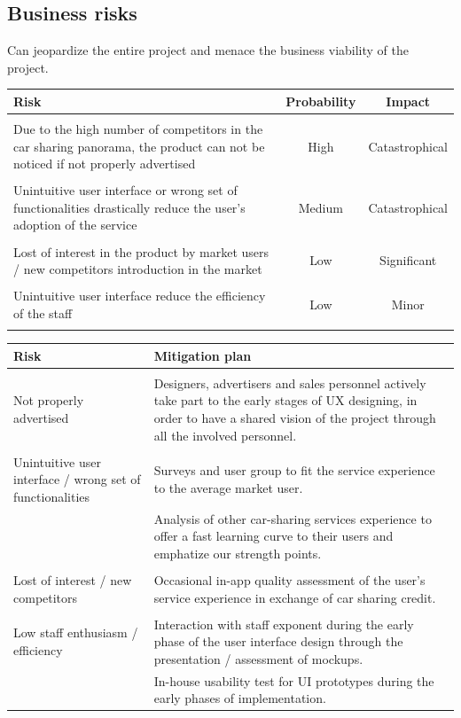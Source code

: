 \documentclass[english]{article}
\begin{document}
	\subsection{Business risks}
	Can jeopardize the entire project and menace the business viability of the project.

	\begin{table}[H]
		\centering
		\begin{tabular}{ p{7cm} c c }
		\textbf{Risk} & \textbf{Probability} & \textbf{Impact} \\ \hline \\
		Due to the high number of competitors in the car sharing panorama, the product can not be noticed if not properly advertised & High & Catastrophical \\ \\
		Unintuitive user interface or wrong set of functionalities drastically reduce the user's adoption of the service & Medium & Catastrophical \\ \\
		Lost of interest in the product by market users / new competitors introduction in the market & Low & Significant \\ \\
		
		Unintuitive user interface reduce the efficiency of the staff & Low & Minor \\ \\
		\end{tabular}
	\end{table}
	
	\begin{table}[H]
		\centering
		\begin{tabular}{ p{6cm} p{6cm} }
		\textbf{Risk} & \textbf{Mitigation plan} \\ \hline \\
		Not properly advertised & Designers, advertisers and sales personnel actively take part to the early stages of UX designing, in order to have a shared vision of the project through all the involved personnel. \\ \\
		Unintuitive user interface / wrong set of functionalities & Surveys and user group to fit the service experience to the average market user. \\ 
		& Analysis of other car-sharing services experience to offer a fast learning curve to their users and emphatize our strength points. \\ \\
		 Lost of interest / new competitors & Occasional in-app quality assessment of the user's service experience in exchange of car sharing credit. \\ \\
		 Low staff enthusiasm / efficiency & Interaction with staff exponent during the early phase of the user interface design through the presentation / assessment of mockups. \\ 
		 & In-house usability test for UI prototypes during the early phases of implementation. \\
		\end{tabular}
	\end{table}
	
\end{document}
